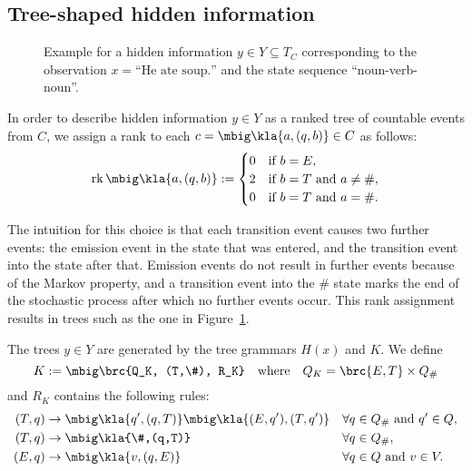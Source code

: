 \subsection{Tree-shaped hidden information}

\begin{figure}[t!]
 \centering
 \caption{Example for a hidden information $y\in Y\subseteq T_C$ corresponding
 to the observation $x = \text{``He ate soup.''}$ and the state sequence
 ``noun-verb-noun''.\label{fig:03-example-y}}
\end{figure}

In order to describe hidden information $y\in Y$ as a ranked tree of countable
events from $C$, we assign a rank to each $c = \mbig\kla{a,(q,b)}\in C$ as follows:
\begin{align*}
 \rk\mbig\kla{a,(q,b)} := \begin{cases}
  0 & \text{if } b = E, \\
  2 & \text{if } b = T \text{ and } a\neq\#, \\
  0 & \text{if } b = T \text{ and } a = \#.
 \end{cases}
\end{align*}

The intuition for this choice is that each transition event causes two further
events: the emission event in the state that was entered, and the transition
event into the state after that. Emission events do not result in further
events because of the Markov property, and a transition event into the $\#$
state marks the end of the stochastic process after which no further events
occur. This rank assignment results in trees such as the one in
Figure~\ref{fig:03-example-y}.

The trees $y\in Y$ are generated by the tree grammars $H(x)$ and $K$. We define
\label{eq:03-K}\[
 K := \mbig\brc{Q_K, (T,\#), R_K} \quad\text{where}\quad Q_K = \brc{E,T} \times Q_\#
\]
and $R_K$ contains the following rules:
\label{eq:03-R_K}\begin{align*}
 (T,q) &\to \mbig\kla{q',(q,T)}\mbig\kla{(E,q'),(T,q')} &&\forall q\in Q_\# \text{ and } q'\in Q, \\
 (T,q) &\to \mbig\kla{\#,(q,T)} &&\forall q\in Q_\#, \\
 (E,q) &\to \mbig\kla{v,(q,E)} &&\forall q\in Q \text{ and } v\in V.
\end{align*}

